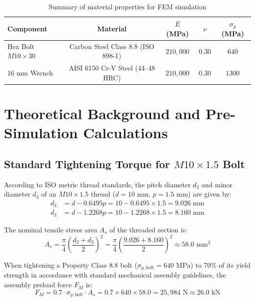 \documentclass[12pt,a4paper]{article}
\begin{document}
\begin{table}[h!]
\centering
\caption{Summary of material properties for FEM simulation}
\vspace{4pt}
\begin{tabular}{@{}lcccc@{}}
\toprule
\textbf{Component} & \textbf{Material} & \textbf{$E$ (MPa)} & \textbf{$\nu$} & \textbf{$\sigma_y$ (MPa)} \\ \midrule
Hex Bolt $M10 \times 30$ & Carbon Steel Class 8.8 (ISO 898-1) & $210,000$ & $0.30$ & $640$ \\
16 mm Wrench & AISI 6150 Cr-V Steel (44--48 HRC) & $210,000$ & $0.30$ & $1300$ \\ \bottomrule
\end{tabular}
\end{table}

\section{Theoretical Background and Pre-Simulation Calculations}

\subsection{Standard Tightening Torque for $M10 \times 1.5$ Bolt}
According to ISO metric thread standards, the pitch diameter $d_2$ and minor diameter $d_3$ of an $M10 \times 1.5$ thread ($d = 10\text{ mm}$, $p = 1.5\text{ mm}$) are given by:
\begin{align}
    d_2 &= d - 0.6495p = 10 - 0.6495 \times 1.5 = 9.026\text{ mm} \\
    d_3 &= d - 1.2268p = 10 - 1.2268 \times 1.5 = 8.160\text{ mm}
\end{align}

The nominal tensile stress area $A_s$ of the threaded section is:
\begin{equation}
    A_s = \frac{\pi}{4} \left( \frac{d_2 + d_3}{2} \right)^2 = \frac{\pi}{4} \left( \frac{9.026 + 8.160}{2} \right)^2 \approx 58.0\text{ mm}^2
\end{equation}

When tightening a Property Class 8.8 bolt ($\sigma_{y,\text{bolt}} = 640\text{ MPa}$) to $70\%$ of its yield strength in accordance with standard mechanical assembly guidelines, the assembly preload force $F_M$ is:
\begin{equation}
    F_M = 0.7 \cdot \sigma_{y,\text{bolt}} \cdot A_s = 0.7 \times 640 \times 58.0 = 25,984\text{ N} \approx 26.0\text{ kN}
\end{equation}
\end{document}
